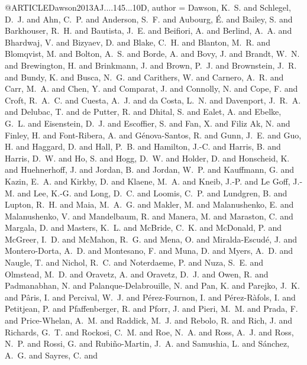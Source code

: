 \documentclass[twocolumn]{aastex62}
\begin{document}
{{{{{{{{{{{{{{{{{{{{{{{{{{@ARTICLE{Dawson2013AJ....145...10D,
   author = {{Dawson}, K.~S. and {Schlegel}, D.~J. and {Ahn}, C.~P. and {Anderson}, S.~F. and 
	{Aubourg}, {\'E}. and {Bailey}, S. and {Barkhouser}, R.~H. and 
	{Bautista}, J.~E. and {Beifiori}, A. and {Berlind}, A.~A. and 
	{Bhardwaj}, V. and {Bizyaev}, D. and {Blake}, C.~H. and {Blanton}, M.~R. and 
	{Blomqvist}, M. and {Bolton}, A.~S. and {Borde}, A. and {Bovy}, J. and 
	{Brandt}, W.~N. and {Brewington}, H. and {Brinkmann}, J. and 
	{Brown}, P.~J. and {Brownstein}, J.~R. and {Bundy}, K. and {Busca}, N.~G. and 
	{Carithers}, W. and {Carnero}, A.~R. and {Carr}, M.~A. and {Chen}, Y. and 
	{Comparat}, J. and {Connolly}, N. and {Cope}, F. and {Croft}, R.~A.~C. and 
	{Cuesta}, A.~J. and {da Costa}, L.~N. and {Davenport}, J.~R.~A. and 
	{Delubac}, T. and {de Putter}, R. and {Dhital}, S. and {Ealet}, A. and 
	{Ebelke}, G.~L. and {Eisenstein}, D.~J. and {Escoffier}, S. and 
	{Fan}, X. and {Filiz Ak}, N. and {Finley}, H. and {Font-Ribera}, A. and 
	{G{\'e}nova-Santos}, R. and {Gunn}, J.~E. and {Guo}, H. and 
	{Haggard}, D. and {Hall}, P.~B. and {Hamilton}, J.-C. and {Harris}, B. and 
	{Harris}, D.~W. and {Ho}, S. and {Hogg}, D.~W. and {Holder}, D. and 
	{Honscheid}, K. and {Huehnerhoff}, J. and {Jordan}, B. and {Jordan}, W.~P. and 
	{Kauffmann}, G. and {Kazin}, E.~A. and {Kirkby}, D. and {Klaene}, M.~A. and 
	{Kneib}, J.-P. and {Le Goff}, J.-M. and {Lee}, K.-G. and {Long}, D.~C. and 
	{Loomis}, C.~P. and {Lundgren}, B. and {Lupton}, R.~H. and {Maia}, M.~A.~G. and 
	{Makler}, M. and {Malanushenko}, E. and {Malanushenko}, V. and 
	{Mandelbaum}, R. and {Manera}, M. and {Maraston}, C. and {Margala}, D. and 
	{Masters}, K.~L. and {McBride}, C.~K. and {McDonald}, P. and 
	{McGreer}, I.~D. and {McMahon}, R.~G. and {Mena}, O. and {Miralda-Escud{\'e}}, J. and 
	{Montero-Dorta}, A.~D. and {Montesano}, F. and {Muna}, D. and 
	{Myers}, A.~D. and {Naugle}, T. and {Nichol}, R.~C. and {Noterdaeme}, P. and 
	{Nuza}, S.~E. and {Olmstead}, M.~D. and {Oravetz}, A. and {Oravetz}, D.~J. and 
	{Owen}, R. and {Padmanabhan}, N. and {Palanque-Delabrouille}, N. and 
	{Pan}, K. and {Parejko}, J.~K. and {P{\^a}ris}, I. and {Percival}, W.~J. and 
	{P{\'e}rez-Fournon}, I. and {P{\'e}rez-R{\`a}fols}, I. and {Petitjean}, P. and 
	{Pfaffenberger}, R. and {Pforr}, J. and {Pieri}, M.~M. and {Prada}, F. and 
	{Price-Whelan}, A.~M. and {Raddick}, M.~J. and {Rebolo}, R. and 
	{Rich}, J. and {Richards}, G.~T. and {Rockosi}, C.~M. and {Roe}, N.~A. and 
	{Ross}, A.~J. and {Ross}, N.~P. and {Rossi}, G. and {Rubi{\~n}o-Martin}, J.~A. and 
	{Samushia}, L. and {S{\'a}nchez}, A.~G. and {Sayres}, C. and 
}}}}}}}}}}}}}}}}}}}}}}}}}}}}
\end{document}
